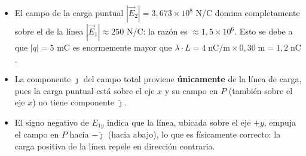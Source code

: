 \documentclass[12pt,letterpaper]{article}
\begin{document}
\begin{itemize}
    \item El campo de la carga puntual $|\vec{E}_2| = 3{,}673\times10^8$ N/C domina completamente sobre el de la l\'inea $|\vec{E}_1| \approx 250$ N/C: la raz\'on es $\approx 1{,}5\times10^6$. Esto se debe a que $|q| = 5$ mC es enormemente mayor que $\lambda\cdot L = 4\;\text{nC/m}\times0{,}30\;\text{m} = 1{,}2\;\text{nC}$.

    \item La componente $\hat{\jmath}$ del campo total proviene \textbf{\'unicamente} de la l\'inea de carga, pues la carga puntual est\'a sobre el eje $x$ y su campo en $P$ (tambi\'en sobre el eje $x$) no tiene componente $\hat{\jmath}$.

    \item El signo negativo de $E_{1y}$ indica que la l\'inea, ubicada sobre el eje $+y$, empuja el campo en $P$ hacia $-\hat{\jmath}$ (hacia abajo), lo que es f\'isicamente correcto: la carga positiva de la l\'inea repele en direcci\'on contraria.
\end{itemize}
\end{document}
